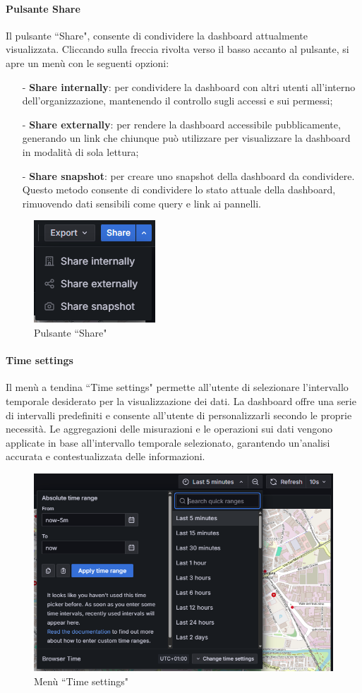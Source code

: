 \documentclass[10pt]{article}
\begin{document}
\begin{justify}
    \paragraph{Pulsante Share}
    Il pulsante ``Share", consente di condividere la dashboard attualmente visualizzata. Cliccando sulla freccia rivolta verso il basso accanto al pulsante, si apre un menù con le seguenti opzioni:
    \begin{itemize}
        \item[-] \textbf{Share internally}: per condividere la dashboard con altri utenti all'interno dell'organizzazione, mantenendo il controllo sugli accessi e sui permessi;
        \item[-] \textbf{Share externally}: per rendere la dashboard accessibile pubblicamente, generando un link che chiunque può utilizzare per visualizzare la dashboard in modalità di sola lettura;
        \item[-] \textbf{Share snapshot}: per creare uno snapshot della dashboard da condividere. Questo metodo consente di condividere lo stato attuale della dashboard, rimuovendo dati sensibili come query e link ai pannelli.
    \end{itemize}
    \begin{figure}[H]
    \centering
    \includegraphics[width=0.25\linewidth]{share.png}
    \caption{Pulsante ``Share"}
    \end{figure}

    \paragraph{Time settings}
    Il menù a tendina ``Time settings" permette all'utente di selezionare l'intervallo temporale desiderato per la visualizzazione dei dati. La dashboard offre una serie di intervalli predefiniti e consente all'utente di personalizzarli secondo le proprie necessità. Le aggregazioni delle misurazioni e le operazioni sui dati vengono applicate in base all'intervallo temporale selezionato, garantendo un'analisi accurata e contestualizzata delle informazioni.
    \begin{figure}[H]
    \centering
    \includegraphics[width=0.7\linewidth]{time.png}
    \caption{Menù ``Time settings"}
    \end{figure}


\end{justify}
\end{document}
